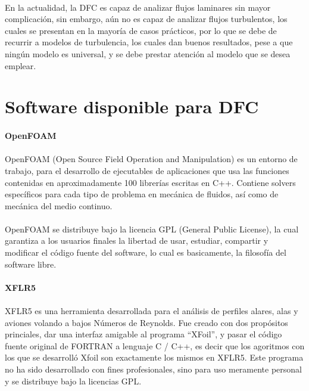 \documentclass[letterpaper, openright, 12pt]{book}
\begin{document}
				\paragraph*{}
					En la actualidad, la DFC es capaz de analizar flujos laminares sin mayor complicación, sin embargo, aún no es capaz de analizar flujos turbulentos, los cuales se presentan en la mayoría de casos prácticos,  por lo que se debe de recurrir a modelos de turbulencia, los cuales dan buenos resultados, pese a que ningún modelo es universal, y se debe prestar atención al modelo que se desea emplear.\cite{cengel}
			
		\section{Software disponible para DFC}
				\paragraph*{OpenFOAM}
				\paragraph*{}
					OpenFOAM (Open Source Field Operation and Manipulation) es un entorno de trabajo, para el desarrollo de ejecutables de aplicaciones que usa las funciones contenidas en aproximadamente 100 librerías escritas en C++. Contiene solvers específicos para cada tipo de problema en mecánica de fluidos, así como de mecánica del medio continuo.\cite{openfoam}
				\paragraph*{}
					OpenFOAM se distribuye bajo la licencia GPL (General Public License), la cual garantiza a los usuarios finales la libertad de usar, estudiar, compartir y modificar el código fuente del software, lo cual es basicamente, la filosofía del software libre.
					
				\paragraph*{XFLR5}
				\paragraph*{}
					XFLR5 es una herramienta desarrollada para el análisis de perfiles alares, alas y aviones volando a bajos Números de Reynolds. Fue creado con dos propósitos princiales, dar una interfaz amigable al programa ``XFoil'', y pasar el código fuente original de FORTRAN a lenguaje C / C++, es decir que los agoritmos con los que se desarrolló Xfoil son exactamente los mismos en XFLR5.\cite{xflr5} Este programa no ha sido desarrollado con fines profesionales, sino para uso meramente personal y se distribuye bajo la licencias GPL.
					
\end{document}
